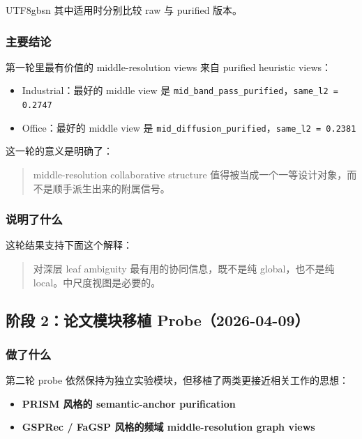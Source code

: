 \documentclass[11pt]{article}
\begin{document}
\begin{CJK*}{UTF8}{gbsn}
其中适用时分别比较 raw 与 purified 版本。

\subsubsection*{主要结论}

第一轮里最有价值的 middle-resolution views 来自 purified heuristic views：

\begin{itemize}
  \item Industrial：最好的 middle view 是 \texttt{mid\_band\_pass\_purified}，\texttt{same\_l2 = 0.2747}
  \item Office：最好的 middle view 是 \texttt{mid\_diffusion\_purified}，\texttt{same\_l2 = 0.2381}
\end{itemize}

这一轮的意义是明确了：

\begin{quote}
middle-resolution collaborative structure 值得被当成一个一等设计对象，而不是顺手派生出来的附属信号。
\end{quote}

\subsubsection*{说明了什么}

这轮结果支持下面这个解释：

\begin{quote}
对深层 leaf ambiguity 最有用的协同信息，既不是纯 global，也不是纯 local。中尺度视图是必要的。
\end{quote}

\subsection{阶段 2：论文模块移植 Probe（2026-04-09）}

\subsubsection*{做了什么}

第二轮 probe 依然保持为独立实验模块，但移植了两类更接近相关工作的思想：

\begin{itemize}
  \item \textbf{PRISM 风格的 semantic-anchor purification}
  \item \textbf{GSPRec / FaGSP 风格的频域 middle-resolution graph views}
\end{itemize}


\end{CJK*}
\end{document}
